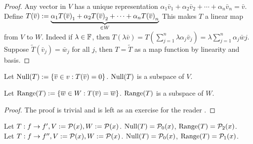 \begin{proof}
    Any vector in $V$ has a unique representation $\alpha_1 \bar v_1 + \alpha_2\bar v_2 + \cdots + \alpha_n \bar v_n = \bar v$.  \\ Define $T(\overline v):= \underbrace{{\alpha}_1{T(\overline v)}_1 + {\alpha}_2{T(\overline v)}_2 + \cdots + {\alpha}_{n}{T(\overline v)}_{n}}_{\in W}$ This makes $T$ a linear map from $V$ to $W$. Indeed if $\lambda \in \mathbb F$, then $T(\lambda \bar v) = T(\sum_{j = 1}^n \lambda \alpha_j \bar v_j) = \lambda \sum_{j = 1}^n \alpha_j \bar wj$. Suppose $\tilde T(\bar v_j) = \bar w_j$ for all $j$, then $T = \tilde T$ as a map function by linearity and basis.
\end{proof}
\begin{theorem}
    Let $\text{Null} (T):= \left\{ \overline v \in  v : T(\overline v) = 0 \right\}$. $\text{Null} (T)$ is a subspace of $V$.
\end{theorem}
\begin{theorem}
    Let $\text{Range} (T):= \left\{ \overline w \in W : T(\overline v) = \overline w \right\}$. $\text{Range}(T)$ is a subspace of $W$.
\end{theorem}
\begin{proof}
    The proof is trivial and is left as an exercise for the reader .
\end{proof}
\begin{example}
    Let $T: f \to f', V:= \mathcal P(x), W:= \mathcal P(x)$. $\text{Null}(T) = \mathcal P_0(x)$, $\text{Range}(T) = \mathcal P_2(x)$. \\
    Let $T: f \to f'', V:= \mathcal P(x), W:= \mathcal P(x)$. $\text{Null}(T) = \mathcal P_0(x)$, $\text{Range}(T) = \mathcal P_1(x)$.
\end{example}


